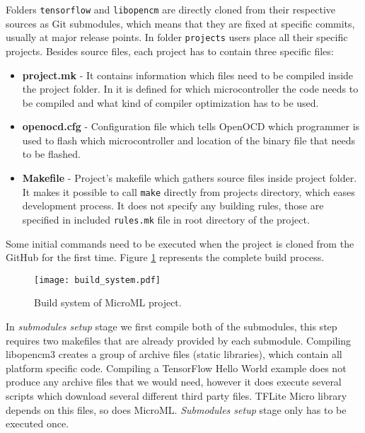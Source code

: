 Folders \verb|tensorflow| and \verb|libopencm| are directly cloned from their respective sources as Git submodules, which means that they are fixed at specific commits, usually at major release points.
In folder \verb|projects| users place all their specific projects.
Besides source files, each project has to contain three specific files:

\begin{itemize}
    \item \textbf{project.mk} - It contains information which files need to be compiled inside the project folder. In it is defined for which microcontroller the code needs to be compiled and what kind of compiler optimization has to be used.
    \item \textbf{openocd.cfg} - Configuration file which tells OpenOCD which programmer is used to flash which microcontroller and location of the binary file that needs to be flashed.
    \item \textbf{Makefile} - Project's makefile which gathers source files inside project folder. It makes it possible to call \verb|make| directly from projects directory, which eases development process. It does not specify any building rules, those are specified in included \verb|rules.mk| file in root directory of the project.
\end{itemize}

Some initial commands need to be executed when the project is cloned from the GitHub for the first time. 
Figure \ref{build_system} represents the complete build process.

\begin{figure}[ht]
        \centering
        \texttt{[image: build\_system.pdf]} 
        \caption{ Build system of MicroML project.} 
        \label{build_system}
\end{figure}

In \textit{submodules setup} stage we first compile both of the submodules, this step requires two makefiles that are already provided by each submodule.
Compiling libopencm3 creates a group of archive files (static libraries), which contain all platform specific code.
Compiling a TensorFlow Hello World example does not produce any archive files that we would need, however it does execute several scripts which download several different third party files.
TFLite Micro library depends on this files, so does MicroML.
\textit{Submodules setup} stage only has to be executed once.


